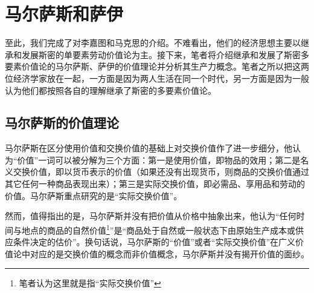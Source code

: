 \section{马尔萨斯和萨伊}

至此，我们完成了对李嘉图和马克思的介绍。不难看出，他们的经济思想主要以继承和发展斯密的单要素劳动价值论为主。接下来，笔者将介绍继承和发展了斯密多要素价值论的马尔萨斯、萨伊的价值理论并分析其生产力概念。笔者之所以把这两位经济学家放在一起，一方面是因为两人生活在同一个时代\cite[132，140]{YanZhiJieXiFangJingJiXueShuoShiJiaoChengDiErBan2013}，另一方面是因为一般认为他们都按照各自的理解继承了斯密的多要素价值论\cite[169]{CaiJiMingCongGuDianZhengZhiJingJiXueDaoZhongGuoTeSeSheHuiZhuYiZhengZhiJingJiXueJiYuZhongGuoShiJiaoDeZhengZhiJingJiXueYanBianShangCe2023}。

\subsection{马尔萨斯的价值理论}

马尔萨斯在区分使用价值和交换价值的基础上对交换价值作了进一步细分，他认为“价值”一词可以被分解为三个方面：第一是使用价值，即物品的效用；第二是名义交换价值，即以货币表示的价值（如果还没有出现货币，则商品的交换价值通过其它任何一种商品表现出来\cite[32]{BiLuo*SiLaFaDaWeiLiJiaTuQuanJiDi2JuanMaErSaSiZhengZhiJingJiXueYuanLiPingZhu2013}）；第三是实际交换价值，即必需品、享用品和劳动的价值\cite[42]{BiLuo*SiLaFaDaWeiLiJiaTuQuanJiDi2JuanMaErSaSiZhengZhiJingJiXueYuanLiPingZhu2013}。马尔萨斯重点研究的是“实际交换价值”。

然而，值得指出的是，马尔萨斯并没有把价值从价格中抽象出来，他认为“任何时间与地点的商品的自然价值\footnote{笔者认为这里就是指“实际交换价值”}”是“商品处于自然或一般状态下由原始生产成本或供应条件决定的估价”\cite[132]{MaErSaSiZhengZhiJingJiXueDingYi2023}。换句话说，马尔萨斯的“价值”或者“实际交换价值”在广义价值论中对应的是交换价值的概念而非价值概念，马尔萨斯并没有揭开价值的面纱。



